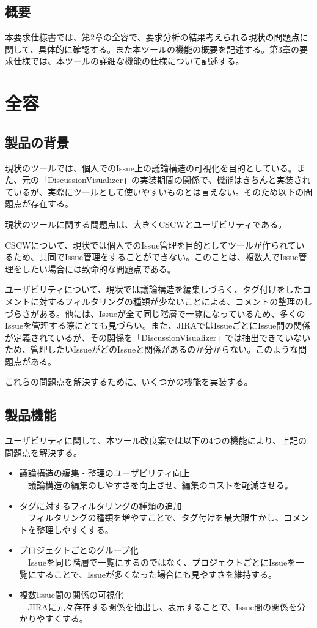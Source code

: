 \documentclass[12pt, oneside]{jreport}
\begin{document}
	\newpage
	
	\section{概要}
	本要求仕様書では、第2章の全容で、要求分析の結果考えられる現状の問題点に関して、具体的に確認する。また本ツールの機能の概要を記述する。第3章の要求仕様では、本ツールの詳細な機能の仕様について記述する。
	

\chapter{全容}

	\section{製品の背景}
	現状のツールでは、個人でのIssue上の議論構造の可視化を目的としている。また、元の「DiscussionVisualizer」の実装期間の関係で、機能はきちんと実装されているが、実際にツールとして使いやすいものとは言えない。そのため以下の問題点が存在する。
	
	現状のツールに関する問題点は、大きくCSCWとユーザビリティである。
	
	CSCWについて、現状では個人でのIssue管理を目的としてツールが作られているため、共同でIssue管理をすることができない。このことは、複数人でIssue管理をしたい場合には致命的な問題点である。
	
	ユーザビリティについて、現状では議論構造を編集しづらく、タグ付けをしたコメントに対するフィルタリングの種類が少ないことによる、コメントの整理のしづらさがある。他には、Issueが全て同じ階層で一覧になっているため、多くのIssueを管理する際にとても見づらい。また、JIRAではIssueごとにIssue間の関係が定義されているが、その関係を「DiscussionVisualizer」では抽出できていないため、管理したいIssueがどのIssueと関係があるのか分からない。このような問題点がある。
	
	これらの問題点を解決するために、いくつかの機能を実装する。
	
	\section{製品機能}
	ユーザビリティに関して、本ツール改良案では以下の4つの機能により、上記の問題点を解決する。
	\begin{itemize}
		\item 議論構造の編集・整理のユーザビリティ向上
		\\
		　議論構造の編集のしやすさを向上させ、編集のコストを軽減させる。
		\item タグに対するフィルタリングの種類の追加
		\\
		　フィルタリングの種類を増やすことで、タグ付けを最大限生かし、コメントを整理しやすくする。
		\item プロジェクトごとのグループ化
		\\
		　Issueを同じ階層で一覧にするのではなく、プロジェクトごとにIssueを一覧にすることで、Issueが多くなった場合にも見やすさを維持する。
		\item 複数Issue間の関係の可視化
		\\
		　JIRAに元々存在する関係を抽出し、表示することで、Issue間の関係を分かりやすくする。
	\end{itemize}
	
\end{document}
